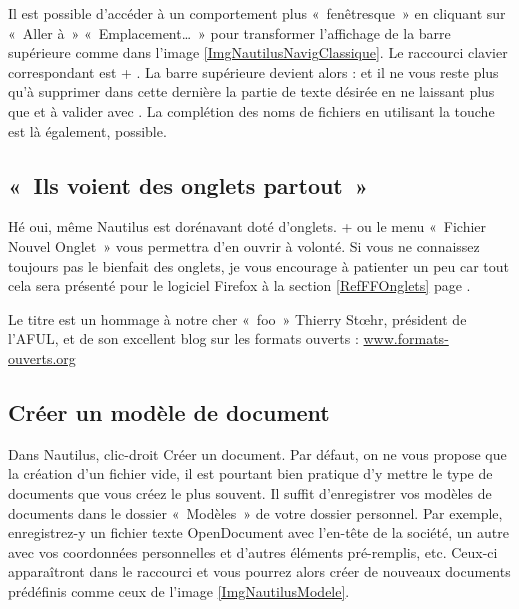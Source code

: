 \begin{nota}
Il est possible d'accéder à un comportement plus «~fenêtresque~» en cliquant sur «~Aller à~» \FlecheDroite «~Emplacement\ldots{}~» pour transformer l'affichage de la barre supérieure comme dans l'image \ref{ImgNautilusNavigClassique}. Le raccourci clavier correspondant est  + . La barre supérieure devient alors :  et il ne vous reste plus qu'à supprimer dans cette dernière la partie de texte désirée en ne laissant plus que  et à valider avec . La complétion des noms de fichiers en utilisant la touche  est là également, possible. 
\end{nota}
\subsection{«~Ils voient des onglets partout~»}
Hé oui, même Nautilus est dorénavant doté d'onglets.  +  ou le menu «~Fichier \FlecheDroite Nouvel Onglet~» vous permettra d'en ouvrir à volonté. Si vous ne connaissez toujours pas le bienfait des onglets, je vous encourage à patienter un peu car tout cela sera présenté pour le logiciel Firefox à la section \ref{RefFFOnglets} page \pageref{RefFFOnglets}.
\begin{nota}
Le titre est un hommage à notre cher «~foo~» Thierry Stœhr, président de l'AFUL, et de son excellent blog sur les formats ouverts : \url{www.formats-ouverts.org}
\end{nota}
\subsection{Créer un modèle de document}
Dans Nautilus, clic-droit \FlecheDroite Créer un document. Par défaut, on ne vous propose que la création d'un fichier vide, il est pourtant bien pratique d'y mettre le type de documents que vous créez le plus souvent. Il suffit d'enregistrer vos modèles de documents dans le dossier «~Modèles~» de votre dossier personnel. Par exemple, enregistrez-y un fichier texte OpenDocument avec l'en-tête de la société, un autre avec vos coordonnées personnelles et d'autres éléments pré-remplis, etc.  Ceux-ci apparaîtront dans le raccourci et vous pourrez alors créer de nouveaux documents prédéfinis comme ceux de l'image \ref{ImgNautilusModele}.
